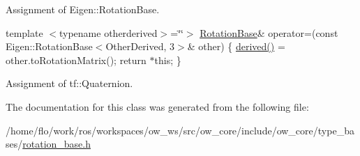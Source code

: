 Assignment of Eigen\+::\+Rotation\+Base. 

template $<$typename otherderived$>$=\char`\"{}\char`\"{}$>$ \hyperlink{classow__core_1_1RotationBase}{Rotation\+Base}\& operator=(const Eigen\+::\+Rotation\+Base$<$\+Other\+Derived, 3$>$\& other) \{ \hyperlink{classow__core_1_1RotationBase_abbbbbdfbcd1cea471d199fdc4903438a}{derived()} = other.\+to\+Rotation\+Matrix(); return $\ast$this; \}

Assignment of tf\+::\+Quaternion. 

The documentation for this class was generated from the following file\+:\begin{DoxyCompactItemize}
\item 
/home/flo/work/ros/workspaces/ow\+\_\+ws/src/ow\+\_\+core/include/ow\+\_\+core/type\+\_\+bases/\hyperlink{rotation__base_8h}{rotation\+\_\+base.\+h}\end{DoxyCompactItemize}
